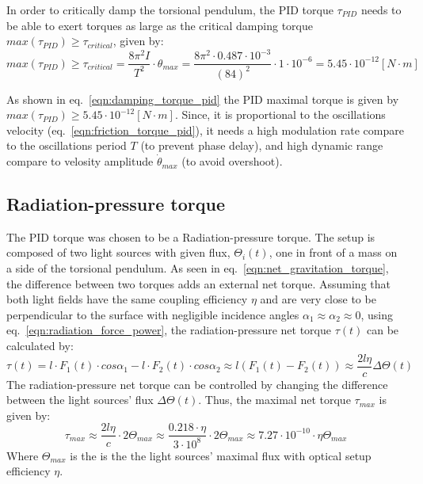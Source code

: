 \documentclass[\main/master.tex]{subfiles}
\begin{document}
In order to critically damp the torsional pendulum, the PID torque $\tau_{PID}$ needs to be able to exert torques as large as the critical damping torque $max(\tau_{PID}) \geq  \tau_{critical}$, given by:
\begin{equation}
max(\tau_{PID}) \geq  \tau_{critical} = \frac{ 8 \pi^2 I }{T^2}\cdot\theta_{max} = \frac{ 8 \pi^2 \cdot 0.487\cdot10^{-3} }{(84)^2}\cdot 1\cdot10^{-6} = 5.45\cdot10^{-12}[N\cdot m]
\label{eqn:damping_torque_pid}
\end{equation}
\par\noindent
As shown in  eq.~\ref{eqn:damping_torque_pid} the PID maximal torque is given by $max(\tau_{PID}) \geq 5.45\cdot10^{-12}[N\cdot m]$. Since, it is proportional to the oscillations velocity (eq.~\ref{eqn:friction_torque_pid}), it needs a high modulation rate compare to the oscillations period $T$ (to prevent phase delay), and high dynamic range compare to velosity amplitude $\dot{\theta}_{max}$ (to avoid overshoot). 
\subsection{Radiation-pressure torque}
The PID torque was chosen to be a Radiation-pressure torque. The setup is composed of two light sources with given flux, $\Theta_i(t)$, one in front of a mass on a side of the torsional pendulum. As seen in eq.~\ref{eqn:net_gravitation_torque}, the difference between two torques adds an external net torque. Assuming that both light fields have the same coupling efficiency $\eta$ and are very close to be perpendicular to the surface with negligible incidence angles $\alpha_1\approx\alpha_2\approx 0$, using eq.~\ref{eqn:radiation_force_power}, the radiation-pressure net torque $\tau(t)$ can be calculated by:  
\begin{equation}
\tau(t) = l\cdot F_1(t) \cdot cos\alpha_1 - l\cdot F_2(t) \cdot cos\alpha_2\approx l(F_1(t) - F_2(t)) \approx \frac{2l\eta}{{c}} \Delta \Theta(t) \label{eqn:radiation torque}
\end{equation}
The radiation-pressure net torque can be controlled by changing the difference between the light sources' flux $\Delta \Theta(t)$. Thus, the maximal net torque $\tau_{max}$ is given by: 
\begin{equation}
\tau_{max}  \approx \frac{2l\eta}{{c}} \cdot 2 \Theta_{max} \approx \frac{0.218\cdot \eta}{{3\cdot10^{8}}} \cdot 2 \Theta_{max} \approx 7.27\cdot10^{-10} \cdot \eta\Theta_{max}   \label{eqn:max radiation torque}
\end{equation}
Where $\Theta_{max}$ is the is the the light sources' maximal flux with optical setup efficiency $\eta$. 
\end{document}
